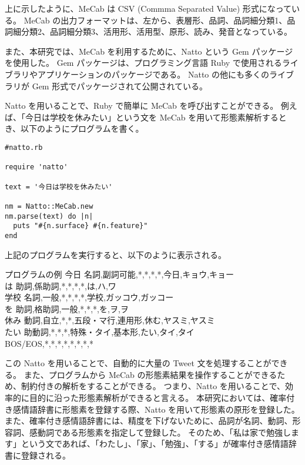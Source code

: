 \documentclass[11pt,a4j]{jsarticle}
\begin{document}
上に示したように、MeCab は CSV (Commma Separated Value) 形式になっている。
MeCab の出力フォーマットは、左から、表層形、品詞、品詞細分類1、品詞細分類2、品詞細分類3、活用形、活用型、原形、読み、発音となっている。

また、本研究では、MeCab を利用するために、Natto という Gem パッケージを使用した。
Gem パッケージは、プログラミング言語 Ruby で使用されるライブラリやアプリケーションのパッケージである。
Natto の他にも多くのライブラリが Gem 形式でパッケージされて公開されている。

Natto を用いることで、Ruby で簡単に MeCab を呼び出すことができる。
例えば、「今日は学校を休みたい」という文を MeCab を用いて形態素解析するとき、以下のようにプログラムを書く。

\begin{verbatim}
#natto.rb

require 'natto'

text = '今日は学校を休みたい'

nm = Natto::MeCab.new
nm.parse(text) do |n|
  puts "#{n.surface} #{n.feature}"
end
\end{verbatim}

上記のプログラムを実行すると、以下のように表示される。

\begin{itembox}[l]{プログラムの例}
  今日  名詞,副詞可能,*,*,*,*,今日,キョウ,キョー \\
  は  助詞,係助詞,*,*,*,*,は,ハ,ワ\\ 
  学校  名詞,一般,*,*,*,*,学校,ガッコウ,ガッコー\\
  を  助詞,格助詞,一般,*,*,*,を,ヲ,ヲ\\
  休み  動詞,自立,*,*,五段・マ行,連用形,休む,ヤスミ,ヤスミ\\
  たい  助動詞,*,*,*,特殊・タイ,基本形,たい,タイ,タイ\\
 BOS/EOS,*,*,*,*,*,*,*,*\\
\end{itembox}

この Natto を用いることで、自動的に大量の Tweet 文を処理することができる。
また、プログラムから MeCab の形態素結果を操作することができるため、制約付きの解析をすることができる。
つまり、Natto を用いることで、効率的に目的に沿った形態素解析ができると言える。
本研究においては、確率付き感情語辞書に形態素を登録する際、Natto を用いて形態素の原形を登録した。
また、確率付き感情語辞書には、精度を下げないために、品詞が名詞、動詞、形容詞、感動詞である形態素を指定して登録した。
そのため、「私は家で勉強します」という文であれば、「わたし」、「家」、「勉強」、「する」が確率付き感情語辞書に登録される。
\end{document}
